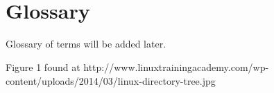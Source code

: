 \documentclass[oneside]{book}
\begin{document}
\section{\\Glossary} \label{App:AppendixB}

Glossary of terms will be added later.

\newpage
\begin{thebibliography}{10}

	 Figure 1 found at http://www.linuxtrainingacademy.com/wp-content/uploads/2014/03/linux-directory-tree.jpg \\

\end{thebibliography}
\end{document}
